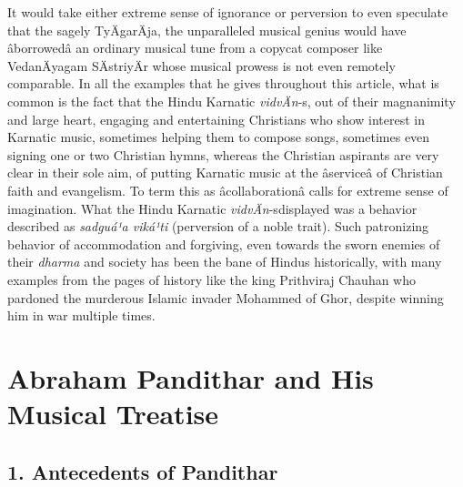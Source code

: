It would take either extreme sense of ignorance or perversion to even speculate that the sagely TyÄgarÄja, the unparalleled musical genius would have âborrowedâ an ordinary musical tune from a copycat composer like VedanÄyagam SÄstriyÄr whose musical prowess is not even remotely comparable. In all the examples that he gives throughout this article, what is common is the fact that the Hindu Karnatic \textit{vidvÄn}-s, out of their magnanimity and large heart, engaging and entertaining Christians who show interest in Karnatic music, sometimes helping them to compose songs, sometimes even signing one or two Christian hymns, whereas the Christian aspirants are very clear in their sole aim, of putting Karnatic music at the âserviceâ of Christian faith and evangelism. To term this as âcollaborationâ calls for extreme sense of imagination. What the Hindu Karnatic \textit{vidvÄn}-s\break displayed was a behavior described as \textit{sadguá¹a viká¹ti} (perversion of a noble trait). Such patronizing behavior of accommodation and forgiving, even towards the sworn enemies of their \textit{dharma} and society has been the bane of Hindus historically, with many examples from the pages of history like the king Prithviraj Chauhan who pardoned the murderous Islamic invader Mohammed of Ghor, despite winning him in war multiple times.

\vspace{-.2cm}

\section*{Abraham Pandithar and His Musical Treatise}

\subsection*{1. Antecedents of Pandithar}

